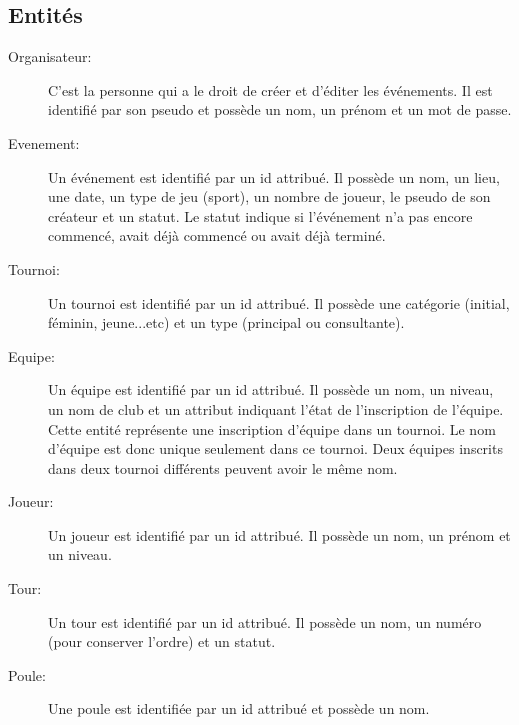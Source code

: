 \documentclass[a4paper,12pt]{report}   %
\begin{document}
\subsection*{Entités}

\vspace{.5cm}


\begin{description}

\item[Organisateur:] C'est la personne qui a le droit de créer et d'éditer les événements. Il est identifié par son pseudo et possède un nom, un prénom et un mot de passe. \\

\item[Evenement:] Un événement est identifié par un id attribué. Il possède un nom, un lieu, une date, un type de jeu (sport), un nombre de joueur, le pseudo de son créateur et un statut. Le statut indique si l'événement n'a pas encore commencé, avait déjà commencé ou avait déjà terminé.\\

\item[Tournoi:] Un tournoi est identifié par un id attribué. Il possède une catégorie (initial, féminin, jeune...etc) et un type (principal ou consultante).\\

\item[Equipe:] Un équipe est identifié par un id attribué. Il possède un nom, un niveau, un nom de club et un attribut indiquant l'état de l'inscription de l'équipe. Cette entité représente une inscription d'équipe dans un tournoi. Le nom d'équipe est donc unique seulement dans ce tournoi. Deux équipes inscrits dans deux tournoi différents peuvent avoir le même nom.\\

\item[Joueur:] Un joueur est identifié par un id attribué. Il possède un nom, un prénom et un niveau.\\

\item[Tour:] Un tour est identifié par un id attribué. Il possède un nom, un numéro (pour conserver l'ordre) et un statut.\\

\item[Poule:] Une poule est identifiée par un id attribué et possède un nom.\\


\end{description}
\end{document}
